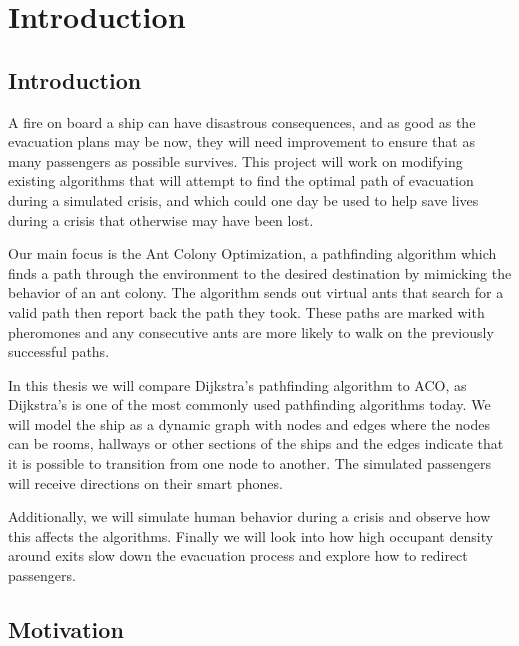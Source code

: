 \chapter{Introduction}
\label{ch:introduction}

\section{Introduction}

A fire on board a ship can have disastrous consequences, and as good as the evacuation plans may be now,                           
they will need improvement to ensure that as many passengers as possible survives. This project will work                           
 on modifying existing algorithms that will attempt to find the optimal path of evacuation during a simulated crisis, and which could         
 one day be used to help save lives during a crisis that otherwise may have been lost. 

Our main focus is the Ant Colony Optimization, a pathfinding algorithm which finds a path through
 the environment to the desired destination by mimicking the behavior of an ant colony. The algorithm sends    
out virtual ants that search for a valid path then report back the path they took.            
These paths are marked with pheromones and any consecutive ants are more likely to walk on the previously successful paths.

In this thesis we will compare Dijkstra's pathfinding algorithm to ACO, as Dijkstra's is one of the most commonly
 used pathfinding algorithms today. We will model the ship as a dynamic graph with nodes and edges where
 the nodes can be rooms, hallways or other sections of the ships and the edges indicate that it is possible to
 transition from one node to another. The simulated passengers will receive directions on their smart phones.

Additionally, we will simulate human behavior during a crisis and observe
 how this affects the algorithms. Finally we will look into how high occupant density around exits slow down the 
evacuation process and explore how to redirect passengers.

\section{Motivation}


